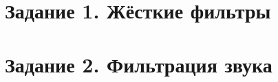 \section{Задание 1. Жёсткие фильтры}

\FloatBarrier

\section{Задание 2. Фильтрация звука}
\FloatBarrier